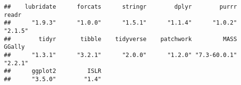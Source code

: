 \documentclass[
]{article}
\newenvironment{Shaded}{\begin{snugshade}}{\end{snugshade}}
\newcommand{\FunctionTok}[1]{\textcolor[rgb]{0.13,0.29,0.53}{\textbf{#1}}}
\newcommand{\NormalTok}[1]{#1}
\newcommand{\SpecialCharTok}[1]{\textcolor[rgb]{0.81,0.36,0.00}{\textbf{#1}}}
\newcommand{\StringTok}[1]{\textcolor[rgb]{0.31,0.60,0.02}{#1}}
\begin{document}
\begin{Shaded}
\end{Shaded}

\begin{verbatim}
##    lubridate      forcats      stringr        dplyr        purrr        readr 
##      "1.9.3"      "1.0.0"      "1.5.1"      "1.1.4"      "1.0.2"      "2.1.5" 
##        tidyr       tibble    tidyverse    patchwork         MASS       GGally 
##      "1.3.1"      "3.2.1"      "2.0.0"      "1.2.0" "7.3-60.0.1"      "2.2.1" 
##      ggplot2         ISLR 
##      "3.5.0"        "1.4"
\end{verbatim}
\end{document}
